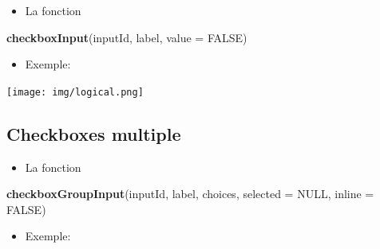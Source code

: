\documentclass[
]{article}
\newenvironment{Shaded}{\begin{snugshade}}{\end{snugshade}}
\newcommand{\AttributeTok}[1]{\textcolor[rgb]{0.13,0.29,0.53}{#1}}
\newcommand{\CommentTok}[1]{\textcolor[rgb]{0.56,0.35,0.01}{\textit{#1}}}
\newcommand{\ConstantTok}[1]{\textcolor[rgb]{0.56,0.35,0.01}{#1}}
\newcommand{\FunctionTok}[1]{\textcolor[rgb]{0.13,0.29,0.53}{\textbf{#1}}}
\newcommand{\NormalTok}[1]{#1}
\newcommand{\StringTok}[1]{\textcolor[rgb]{0.31,0.60,0.02}{#1}}
\providecommand{\tightlist}{%
  \setlength{\itemsep}{0pt}\setlength{\parskip}{0pt}}
\begin{document}
\begin{itemize}
\tightlist
\item
  La fonction
\end{itemize}

\begin{Shaded}
\begin{Highlighting}[]
\FunctionTok{checkboxInput}\NormalTok{(inputId, label, }\AttributeTok{value =} \ConstantTok{FALSE}\NormalTok{)}
\end{Highlighting}
\end{Shaded}

\begin{itemize}
\tightlist
\item
  Exemple:
\end{itemize}

\begin{Shaded}
\end{Shaded}

\texttt{[image: img/logical.png]}

\hypertarget{checkboxes-multiple}{%
\subsection{Checkboxes multiple}\label{checkboxes-multiple}}

\begin{itemize}
\tightlist
\item
  La fonction
\end{itemize}

\begin{Shaded}
\begin{Highlighting}[]
\FunctionTok{checkboxGroupInput}\NormalTok{(inputId, label, choices, }\AttributeTok{selected =} \ConstantTok{NULL}\NormalTok{, }\AttributeTok{inline =} \ConstantTok{FALSE}\NormalTok{)}
\end{Highlighting}
\end{Shaded}

\begin{itemize}
\tightlist
\item
  Exemple:
\end{itemize}
\end{document}
